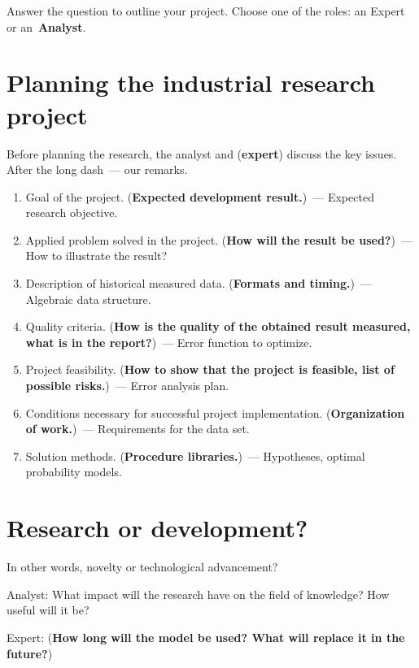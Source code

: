 \documentclass[12pt]{article}
\date{}
\begin{document}
\maketitle

Answer the question to outline your project. Choose one of the roles: an {Expert} or an~\textbf{Analyst}.


\section{Planning the industrial research project}
Before planning the research, the analyst and (\textbf{expert}) discuss the key issues. After the long dash~--- our remarks.

\begin{enumerate}
\item Goal of the project. (\textbf{Expected development result.})~---
Expected research objective.
\item Applied problem solved in the project. (\textbf{How will the result be used?})~--- How to illustrate the result?
\item Description of historical measured data. (\textbf{Formats and timing.})~--- Algebraic data structure.
\item Quality criteria. (\textbf{How is the quality of the obtained result measured, what is in the report?})~--- Error function to optimize.
\item Project feasibility. (\textbf{How to show that the project is feasible, list of possible risks.})~--- Error analysis plan.
\item Conditions necessary for successful project implementation. (\textbf{Organization of work.})~--- Requirements for the data set.
\item Solution methods. (\textbf{Procedure libraries.})~--- Hypotheses, optimal probability models.
\end{enumerate}

\section{Research or development?}
In other words, novelty or technological advancement?

{Analyst:} What impact will the research have on the field of knowledge? How useful will it be?

{Expert:} (\textbf{How long will the model be used? What will replace it in the future?})

%
%
\end{document}
